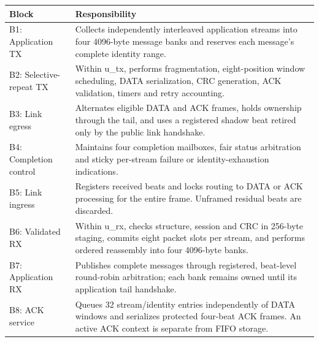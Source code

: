 \documentclass[11pt,a4paper]{article}
\begin{document}
{\small\begin{longtable}{@{}L{0.24\textwidth}L{0.7\textwidth}@{}}\toprule

\textbf{Block} & \textbf{Responsibility}\\\midrule\endhead

B1: Application TX & Collects independently interleaved application streams into four 4096-byte message banks and reserves each message's complete identity range.\\[3pt]

B2: Selective-repeat TX & Within u\_\allowbreak{}tx,\allowbreak{} performs fragmentation,\allowbreak{} eight-position window scheduling,\allowbreak{} DATA serialization,\allowbreak{} CRC generation,\allowbreak{} ACK validation,\allowbreak{} timers and retry accounting.\\[3pt]

B3: Link egress & Alternates eligible DATA and ACK frames,\allowbreak{} holds ownership through the tail,\allowbreak{} and uses a registered shadow beat retired only by the public link handshake.\\[3pt]

B4: Completion control & Maintains four completion mailboxes,\allowbreak{} fair status arbitration and sticky per-stream failure or identity-exhaustion indications.\\[3pt]

B5: Link ingress & Registers received beats and locks routing to DATA or ACK processing for the entire frame. Unframed residual beats are discarded.\\[3pt]

B6: Validated RX & Within u\_\allowbreak{}rx,\allowbreak{} checks structure,\allowbreak{} session and CRC in 256-byte staging,\allowbreak{} commits eight packet slots per stream,\allowbreak{} and performs ordered reassembly into four 4096-byte banks.\\[3pt]

B7: Application RX & Publishes complete messages through registered,\allowbreak{} beat-level round-robin arbitration; each bank remains owned until its application tail handshake.\\[3pt]

B8: ACK service & Queues 32 stream/\allowbreak{}identity entries independently of DATA windows and serializes protected four-beat ACK frames. An active ACK context is separate from FIFO storage.\\[3pt]

\bottomrule\end{longtable}}
\end{document}
